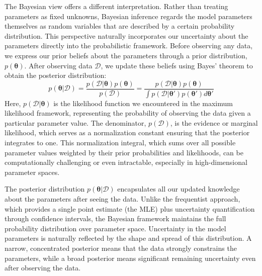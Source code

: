 The Bayesian view offers a different interpretation. Rather than treating parameters as fixed unknowns, Bayesian inference regards the model parameters themselves as random variables that are described by a certain probability distribution. This perspective naturally incorporates our uncertainty about the parameters directly into the probabilistic framework. Before observing any data, we express our prior beliefs about the parameters through a prior distribution, $p(\boldsymbol{\theta})$. After observing data $\mathcal{D}$, we update these beliefs using Bayes' theorem to obtain the posterior distribution:
\begin{equation}
    p(\boldsymbol{\theta}|\mathcal{D}) = \frac{p(\mathcal{D}|\boldsymbol{\theta})p(\boldsymbol{\theta})}{p(\mathcal{D})} = \frac{p(\mathcal{D}|\boldsymbol{\theta})p(\boldsymbol{\theta})}{\int p(\mathcal{D}|\boldsymbol{\theta}')p(\boldsymbol{\theta}')d\boldsymbol{\theta}'}
\end{equation}
Here, $p(\mathcal{D}|\boldsymbol{\theta})$ is the likelihood function we encountered in the maximum likelihood framework, representing the probability of observing the data given a particular parameter value. The denominator, $p(\mathcal{D})$, is the evidence or marginal likelihood, which serves as a normalization constant ensuring that the posterior integrates to one. This normalization integral, which sums over all possible parameter values weighted by their prior probabilities and likelihoods, can be computationally challenging or even intractable, especially in high-dimensional parameter spaces.

The posterior distribution $p(\boldsymbol{\theta}|\mathcal{D})$ encapsulates all our updated knowledge about the parameters after seeing the data. Unlike the frequentist approach, which provides a single point estimate (the MLE) plus uncertainty quantification through confidence intervals, the Bayesian framework maintains the full probability distribution over parameter space. Uncertainty in the model parameters is naturally reflected by the shape and spread of this distribution. A narrow, concentrated posterior means that the data strongly constrains the parameters, while a broad posterior means significant remaining uncertainty even after observing the data.

